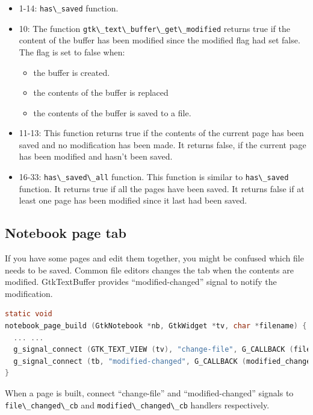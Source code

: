 \begin{itemize}
\tightlist
\item
  1-14: \passthrough{\lstinline!has\_saved!} function.
\item
  10: The function
  \passthrough{\lstinline!gtk\_text\_buffer\_get\_modified!} returns
  true if the content of the buffer has been modified since the modified
  flag had set false. The flag is set to false when:

  \begin{itemize}
  \tightlist
  \item
    the buffer is created.
  \item
    the contents of the buffer is replaced
  \item
    the contents of the buffer is saved to a file.
  \end{itemize}
\item
  11-13: This function returns true if the contents of the current page
  has been saved and no modification has been made. It returns false, if
  the current page has been modified and hasn't been saved.
\item
  16-33: \passthrough{\lstinline!has\_saved\_all!} function. This
  function is similar to \passthrough{\lstinline!has\_saved!} function.
  It returns true if all the pages have been saved. It returns false if
  at least one page has been modified since it last had been saved.
\end{itemize}

\hypertarget{notebook-page-tab}{%
\subsection{Notebook page tab}\label{notebook-page-tab}}

If you have some pages and edit them together, you might be confused
which file needs to be saved. Common file editors changes the tab when
the contents are modified. GtkTextBuffer provides ``modified-changed''
signal to notify the modification.

\begin{lstlisting}[language=C]
static void
notebook_page_build (GtkNotebook *nb, GtkWidget *tv, char *filename) {
  ... ...
  g_signal_connect (GTK_TEXT_VIEW (tv), "change-file", G_CALLBACK (file_changed_cb), NULL);
  g_signal_connect (tb, "modified-changed", G_CALLBACK (modified_changed_cb), tv);
}
\end{lstlisting}

When a page is built, connect ``change-file'' and ``modified-changed''
signals to \passthrough{\lstinline!file\_changed\_cb!} and
\passthrough{\lstinline!modified\_changed\_cb!} handlers respectively.

